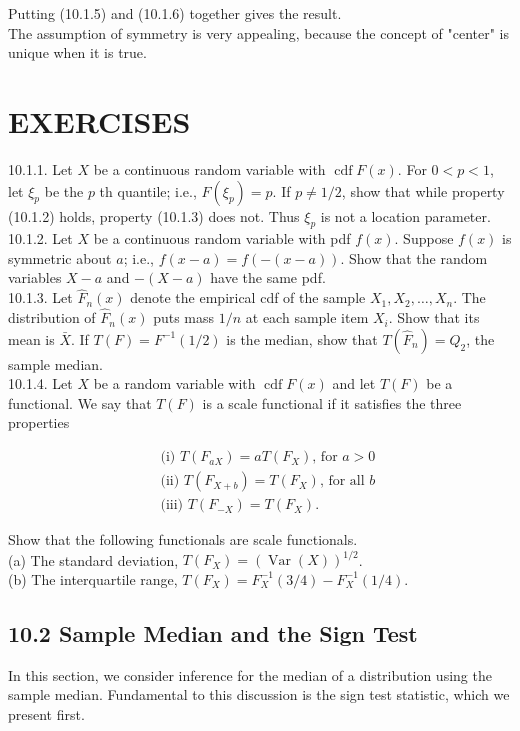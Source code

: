 Putting (10.1.5) and (10.1.6) together gives the result.\\
The assumption of symmetry is very appealing, because the concept of "center" is unique when it is true.

\section*{EXERCISES}
10.1.1. Let $X$ be a continuous random variable with $\operatorname{cdf} F(x)$. For $0<p<1$, let $\xi_{p}$ be the $p$ th quantile; i.e., $F\left(\xi_{p}\right)=p$. If $p \neq 1 / 2$, show that while property (10.1.2) holds, property (10.1.3) does not. Thus $\xi_{p}$ is not a location parameter.\\
10.1.2. Let $X$ be a continuous random variable with pdf $f(x)$. Suppose $f(x)$ is symmetric about $a$; i.e., $f(x-a)=f(-(x-a))$. Show that the random variables $X-a$ and $-(X-a)$ have the same pdf.\\
10.1.3. Let $\widehat{F}_{n}(x)$ denote the empirical cdf of the sample $X_{1}, X_{2}, \ldots, X_{n}$. The distribution of $\widehat{F}_{n}(x)$ puts mass $1 / n$ at each sample item $X_{i}$. Show that its mean is $\bar{X}$. If $T(F)=F^{-1}(1 / 2)$ is the median, show that $T\left(\widehat{F}_{n}\right)=Q_{2}$, the sample median.\\
10.1.4. Let $X$ be a random variable with $\operatorname{cdf} F(x)$ and let $T(F)$ be a functional. We say that $T(F)$ is a scale functional if it satisfies the three properties

$$
\begin{aligned}
& \text { (i) } T\left(F_{a X}\right)=a T\left(F_{X}\right) \text {, for } a>0 \\
& \text { (ii) } T\left(F_{X+b}\right)=T\left(F_{X}\right) \text {, for all } b \\
& \text { (iii) } T\left(F_{-X}\right)=T\left(F_{X}\right) \text {. }
\end{aligned}
$$

Show that the following functionals are scale functionals.\\
(a) The standard deviation, $T\left(F_{X}\right)=(\operatorname{Var}(X))^{1 / 2}$.\\
(b) The interquartile range, $T\left(F_{X}\right)=F_{X}^{-1}(3 / 4)-F_{X}^{-1}(1 / 4)$.

\subsection*{10.2 Sample Median and the Sign Test}
In this section, we consider inference for the median of a distribution using the sample median. Fundamental to this discussion is the sign test statistic, which we present first.

